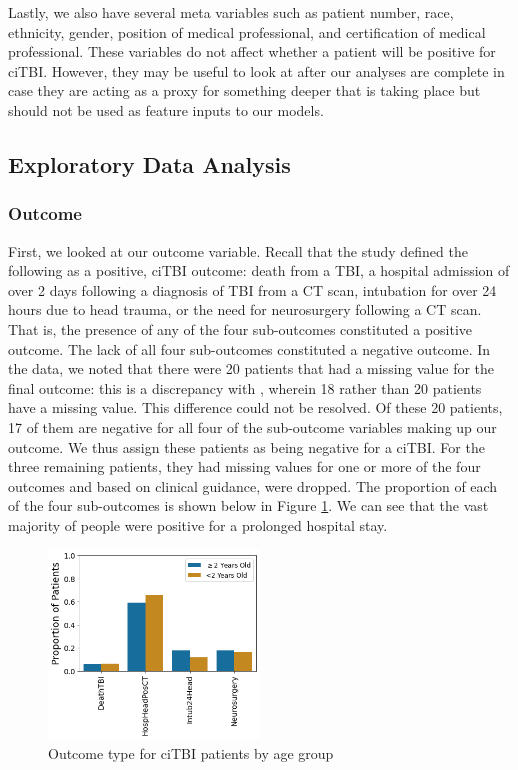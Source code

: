 \documentclass[11pt, letterpaper]{amsart}
\let\Oldsubsection\subsection
\renewcommand{\subsection}{\FloatBarrier\Oldsubsection}
\let\Oldsubsubsection\subsubsection
\renewcommand{\subsubsection}{\FloatBarrier\Oldsubsubsection}
\begin{document}
Lastly, we also have several meta variables such as patient number, race, ethnicity, gender, position of medical professional, and certification of medical professional. These variables do not affect whether a patient will be positive for ciTBI. However, they may be useful to look at after our analyses are complete in case they are acting as a proxy for something deeper that is taking place but should not be used as feature inputs to our models.

\subsection{Exploratory Data Analysis} \label{ssec:eda}

\subsubsection{Outcome}

First, we looked at our outcome variable. Recall that the study defined the following as a positive, ciTBI outcome: death from a TBI, a hospital admission of over 2 days following a diagnosis of TBI from a CT scan, intubation for over 24 hours due to head trauma, or the need for neurosurgery following a CT scan. That is, the presence of any of the four sub-outcomes constituted a positive outcome. The lack of all four sub-outcomes constituted a negative outcome. In the data, we noted that there were 20 patients that had a missing value for the final outcome: this is a discrepancy with \cite{kuppermann2009identification}, wherein 18 rather than 20 patients have a missing value. This difference could not be resolved. Of these 20 patients, 17 of them are negative for all four of the sub-outcome variables making up our outcome. We thus assign these patients as being negative for a ciTBI. For the three remaining patients, they had missing values for one or more of the four outcomes and based on clinical guidance, were dropped. The proportion of each of the four sub-outcomes is shown below in Figure \ref{fig:outcome_type}. We can see that the vast majority of people were positive for a prolonged hospital stay.
\begin{figure}
	\centering
	\includegraphics[width=0.5\textwidth]{outcome_type.png}
	\caption{Outcome type for ciTBI patients by age group}\label{fig:outcome_type}
\end{figure}
\end{document}
